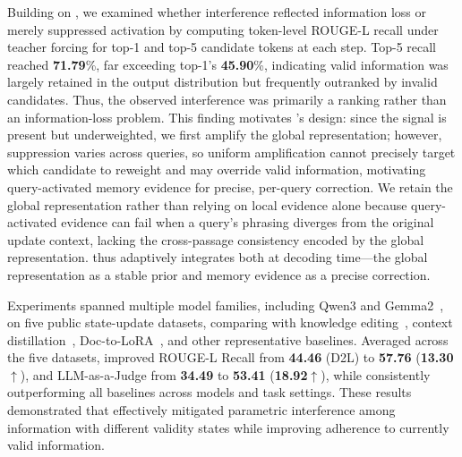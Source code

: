 Building on \benchmark{}, we examined whether interference reflected information loss or merely suppressed activation by computing token-level ROUGE-L recall under teacher forcing for top-1 and top-5 candidate tokens at each step.
Top-5 recall reached \textbf{71.79}\%, far exceeding top-1's \textbf{45.90}\%, indicating valid information was largely retained in the output distribution but frequently outranked by invalid candidates. 
Thus, the observed interference was primarily a ranking rather than an information-loss problem. 
This finding motivates \method{}'s design: since the signal is present but underweighted, we first amplify the global representation; however, suppression varies across queries, so uniform amplification cannot precisely target which candidate to reweight and may override valid information, motivating query-activated memory evidence for precise, per-query correction. 
We retain the global representation rather than relying on local evidence alone because query-activated evidence can fail when a query's phrasing diverges from the original update context, lacking the cross-passage consistency encoded by the global representation. 
\method{} thus adaptively integrates both at decoding time---the global representation as a stable prior and memory evidence as a precise correction.

Experiments spanned multiple model families, including Qwen3 and Gemma2~\citep{yang2025qwen3,team2024gemma}, on five public state-update datasets, comparing \method{} with knowledge editing~\citep{jiang2025anyedit}, context distillation~\citep{askell2021general,snell2022learning}, Doc-to-LoRA~\citep{charakorn2026doc}, and other representative baselines.
Averaged across the five datasets, \method{} improved ROUGE-L Recall from \textbf{44.46} (D2L) to \textbf{57.76} (\textbf{13.30}$\uparrow$), and LLM-as-a-Judge from \textbf{34.49} to \textbf{53.41} (\textbf{18.92}$\uparrow$), while consistently outperforming all baselines across models and task settings.
These results demonstrated that \method{} effectively mitigated parametric interference among information with different validity states while improving adherence to currently valid information.
